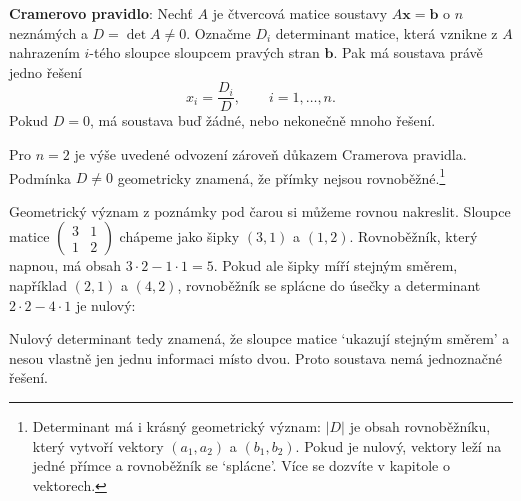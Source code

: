 \begin{definitionbox}
  \textbf{Cramerovo pravidlo}: Nechť $A$ je čtvercová matice soustavy $A\mathbf{x} = \mathbf{b}$ o $n$ neznámých a $D = \det A\neq 0$. Označme $D_i$ determinant matice, která vznikne z $A$ nahrazením $i$-tého sloupce sloupcem pravých stran $\mathbf{b}$. Pak má soustava právě jedno řešení
  \begin{equation*}
    x_i = \frac{D_i}{D},\qquad i = 1, \ldots, n.
  \end{equation*}
  Pokud $D = 0$, má soustava buď žádné, nebo nekonečně mnoho řešení.
\end{definitionbox}

Pro $n = 2$ je výše uvedené odvození zároveň důkazem Cramerova pravidla. Podmínka $D\neq 0$ geometricky znamená, že přímky nejsou rovnoběžné.\footnote{Determinant má i krásný geometrický význam: $|D|$ je obsah rovnoběžníku, který vytvoří vektory $(a_1, a_2)$ a $(b_1, b_2)$. Pokud je nulový, vektory leží na jedné přímce a rovnoběžník se `splácne'. Více se dozvíte v kapitole o vektorech.}

Geometrický význam z poznámky pod čarou si můžeme rovnou nakreslit. Sloupce matice $\begin{pmatrix} 3 & 1\\ 1 & 2 \end{pmatrix}$ chápeme jako šipky $(3, 1)$ a $(1, 2)$. Rovnoběžník, který napnou, má obsah $3\cdot 2 - 1\cdot 1 = 5$. Pokud ale šipky míří stejným směrem, například $(2, 1)$ a $(4, 2)$, rovnoběžník se splácne do úsečky a determinant $2\cdot 2 - 4\cdot 1$ je nulový:
\begin{center}
\end{center}
Nulový determinant tedy znamená, že sloupce matice `ukazují stejným směrem' a nesou vlastně jen jednu informaci místo dvou. Proto soustava nemá jednoznačné řešení.

